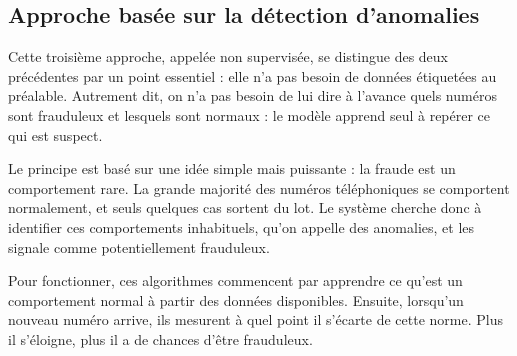 \documentclass[12pt, oneside, a4paper]{report}
\begin{document}
\subsection{ Approche basée sur la détection d'anomalies}
Cette troisième approche, appelée non supervisée, se distingue des deux précédentes par un point essentiel : elle n'a pas besoin de données étiquetées au préalable. Autrement dit, on n'a pas besoin de lui dire à l'avance quels numéros sont frauduleux et lesquels sont normaux : le modèle apprend seul à repérer ce qui est suspect.

Le principe est basé sur une idée simple mais puissante : la fraude est un comportement rare. La grande majorité des numéros téléphoniques se comportent normalement, et seuls quelques cas sortent du lot. Le système cherche donc à identifier ces comportements inhabituels, qu'on appelle des anomalies, et les signale comme potentiellement frauduleux.

Pour fonctionner, ces algorithmes commencent par apprendre ce qu'est un comportement normal à partir des données disponibles. Ensuite, lorsqu'un nouveau numéro arrive, ils mesurent à quel point il s'écarte de cette norme. Plus il s'éloigne, plus il a de chances d'être frauduleux.
\end{document}
